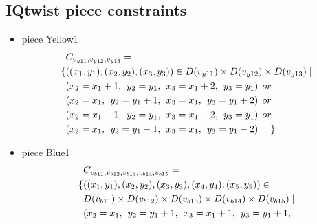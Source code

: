 \begin{appendices}
\section{IQtwist piece constraints}
\label{appendix:2Dpieces}
\begin{itemize}
  \item piece Yellow1\\
  \begin{align*}
&C_{v_{y11},v_{y12},v_{y13}}=\\
\{&((x_{1},y_{1}),(x_{2},y_{2}),(x_{3},y_{3}))\in D(v_{y11})\times D(v_{y12})\times D(v_{y13})\mid\\
&(x_{2} = x_{1} + 1,\hspace{1ex}y_{2} = y_{1},\hspace{1ex}x_{3} = x_{1} + 2, \hspace{1ex}y_{3} = y_{1})\hspace{1ex} or\\
&(x_{2} = x_{1},\hspace{1ex}y_{2} = y_{1}+1,\hspace{1ex}x_{3} = x_{1}, \hspace{1ex}y_{3} = y_{1}+2)\hspace{1ex} or\\
&(x_{2} = x_{1}-1,\hspace{1ex}y_{2} = y_{1},\hspace{1ex}x_{3} = x_{1}-2,\hspace{1ex} y_{3} = y_{1})\hspace{1ex} or\\
&(x_{2} = x_{1},\hspace{1ex}y_{2} = y_{1}-1,\hspace{1ex}x_{3} = x_{1}, \hspace{1ex}y_{3} = y_{1}-2)\hspace{3ex} \}
\end{align*} 
  \item piece Blue1 
  \begin{align*}
&\Cons{b11}{b12}{b13}{b14}{b15}=
\\\{&((x_{1},y_{1}),(x_{2},y_{2}),(x_{3},y_{3}),(x_{4},y_{4}),(x_{5},y_{5}))\in \\
&\Domain {b11} \times \Domain{b12}\times \Domain{b13}\times \Domain{b14}\times \Domain{b15} \mid\\
&(x_{2} = x_{1},\hspace{1ex}y_{2} = y_{1}+1,\hspace{1ex}x_{3} = x_{1}+1,\hspace{1ex}y_{3} = y_{1}+1,

\end{align*}
\end{itemize}
\end{appendices}
